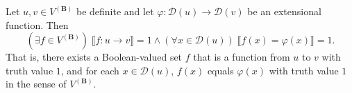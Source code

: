 Let $u, v \in V^{(\mathbf{B})}$ be definite and let $\varphi: \mathcal{D}(u) \to \mathcal{D}(v)$ be an extensional function. Then
$$(\exists f \in V^{(\mathbf{B})})\; \llbracket f: u \to v \rrbracket = 1 \land (\forall x \in \mathcal{D}(u))\; \llbracket f(x) = \varphi(x) \rrbracket = 1.$$
That is, there exists a Boolean-valued set $f$ that is a function from $u$ to $v$ with truth value $1$, and for each $x \in \mathcal{D}(u)$, $f(x)$ equals $\varphi(x)$ with truth value $1$ in the sense of $V^{(\mathbf{B})}$.
